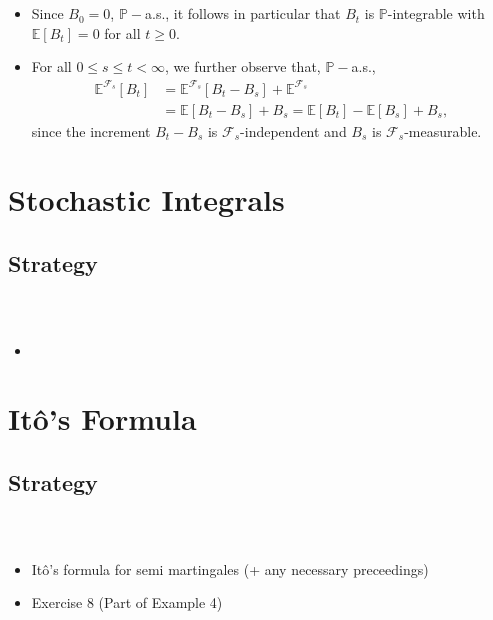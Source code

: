 \documentclass{beamer}
\numberwithin{equation}{section}
\newenvironment{frame2}{\begin{frame}\frametitle{{\normalsize \secname} \\ {\large \subsecname}}}{\end{frame}}
\begin{document}
\begin{frame2}
    \begin{itemize}
        \item Since $B_0 = 0$, $\mathbb{P}-$a.s., it follows in particular that $B_t$ is $\mathbb{P}$-integrable with $\mathbb{E}[B_t] = 0$ for all $t \geq 0$.
        \item For all $0 \leq s \leq t < \infty$, we further observe that, $\mathbb{P}-$a.s.,
        \begin{align}
            \mathbb{E}^{\mathcal{F}_s}[B_t] &= \mathbb{E}^{\mathcal{F}_s}[B_t - B_s] + \mathbb{E}^{\mathcal{F}_s} \\
             &= \mathbb{E}[B_t - B_s] + B_s = \mathbb{E}[B_t] - \mathbb{E}[B_s] + B_s, 
        \end{align}
        since the increment $B_t - B_s$ is $\mathcal{F}_s$-independent and $B_s$ is $\mathcal{F}_s$-measurable.
    \end{itemize}
\end{frame2}

\section{Stochastic Integrals}

\subsection{Strategy}
\begin{frame2}
    \begin{itemize}
        \item 
    \end{itemize}
\end{frame2}

\section{Itô's Formula}

\subsection{Strategy}
\begin{frame2}
    \begin{itemize}
        \item Itô's formula for semi martingales (+ any necessary preceedings)
        \item Exercise 8 (Part of Example 4)
    \end{itemize}
\end{frame2}
\end{document}
